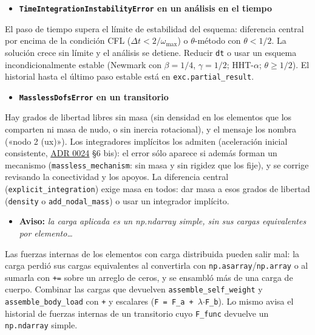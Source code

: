 \documentclass[11pt,oneside]{report}
\begin{document}
\begin{itemize}
  \item \textbf{\texttt{TimeIntegrationInstabilityError} en un análisis en el tiempo}
\end{itemize}
  El paso de tiempo supera el límite de estabilidad del esquema: diferencia central por encima de la condición CFL ($\Delta t < 2/\omega_{\max}$) o \ensuremath{\theta}-método con $\theta < 1/2$. La solución crece sin límite y el análisis se detiene. Reducir \texttt{dt} o usar un esquema incondicionalmente estable (Newmark con $\beta = 1/4$, $\gamma = 1/2$; HHT-\ensuremath{\alpha}; $\theta \ge 1/2$). El historial hasta el último paso estable está en \texttt{exc.\allowbreak{}partial\_\allowbreak{}result}.

\begin{itemize}
  \item \textbf{\texttt{MasslessDofsError} en un transitorio}
\end{itemize}
  Hay grados de libertad libres sin masa (sin densidad en los elementos que los comparten ni masa de nudo, o sin inercia rotacional), y el mensaje los nombra («nodo 2 (ux)»). Los integradores implícitos los admiten (aceleración inicial consistente, \href{https://github.com/jretamav/solidum-fem/blob/main/docs/adr/0024-masas-de-nudo-y-modal-con-dof-sin-masa.md}{ADR 0024} §6 bis): el error sólo aparece si además forman un mecanismo (\texttt{massless\_\allowbreak{}mechanism}: sin masa y sin rigidez que los fije), y se corrige revisando la conectividad y los apoyos. La diferencia central (\texttt{explicit\_\allowbreak{}integration}) exige masa en todos: dar masa a esos grados de libertad (\texttt{density} o \texttt{add\_nodal\_mass}) o usar un integrador implícito.

\begin{itemize}
  \item \textbf{Aviso:} \textit{la carga aplicada es un np.ndarray simple, sin sus cargas equivalentes por elemento\ldots{}}
\end{itemize}
  Las fuerzas internas de los elementos con carga distribuida pueden salir mal: la carga perdió sus cargas equivalentes al convertirla con \texttt{np.asarray}/\texttt{np.array} o al sumarla con \texttt{+=} sobre un arreglo de ceros, y se ensambló más de una carga de cuerpo. Combinar las cargas que devuelven \texttt{assemble\_\allowbreak{}self\_\allowbreak{}weight} y \texttt{assemble\_\allowbreak{}body\_\allowbreak{}load} con \texttt{+} y escalares (\texttt{F = F\_a + \ensuremath{\lambda}\ensuremath{\cdot}F\_b}). Lo mismo avisa el historial de fuerzas internas de un transitorio cuyo \texttt{F\_func} devuelve un \texttt{np.ndarray} simple.
\end{document}
